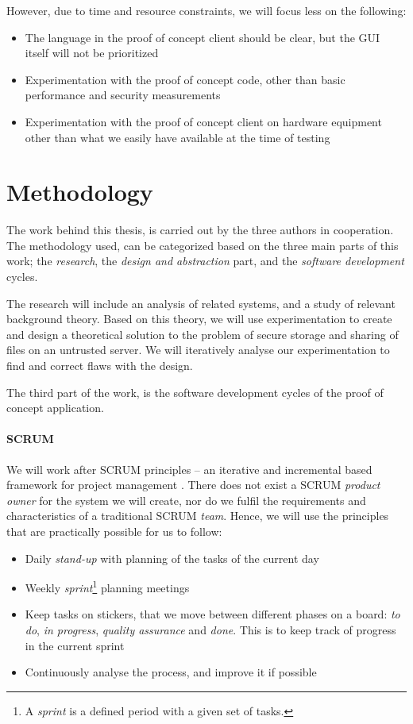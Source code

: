 \documentclass[pdftex,english,10pt,b5paper,twoside]{book}
\begin{document}
However, due to time and resource constraints, we will focus less on the following:
\begin{itemize}
  \item The language in the proof of concept client should be clear, but the
    \ac{GUI} itself will not be prioritized
  \item Experimentation with the proof of concept code, other
    than basic performance and security measurements
  \item Experimentation with the proof of concept client on hardware equipment
    other than what we easily have available at the time of testing
\end{itemize}

\section{Methodology}
\label{methodology}
The work behind this thesis, is carried out by the three authors in
cooperation. The methodology used, can be categorized based on the three main
parts of this work; the \emph{research}, the \emph{design and abstraction}
part, and the \emph{software development} cycles.

The research will include an analysis of related systems, and a study of
relevant background theory. Based on this theory, we will use experimentation
to create and design a theoretical solution to the problem of secure storage
and sharing of files on an untrusted server. We will iteratively analyse our
experimentation to find and correct flaws with the design.

The third part of the work, is the software development cycles of the proof of
concept application.

\paragraph{SCRUM} We will work after SCRUM principles -- an iterative and
incremental based framework for project management \cite{scrum}. There does not
exist a SCRUM \emph{product owner} for the system we will create, nor do we
fulfil the requirements and characteristics of a traditional SCRUM
\emph{team}\cite{scrum}. Hence, we will use the principles that are practically
possible for us to follow:

\begin{itemize}
  \item Daily \emph{stand-up} with planning of the tasks of the current day
  \item Weekly \emph{sprint}\footnote{A \emph{sprint} is a defined period with
    a given set of tasks.} planning meetings
  \item Keep tasks on stickers, that we move between different phases on a
    board: \emph{to do}, \emph{in progress}, \emph{quality assurance} and
    \emph{done}. This is to keep track of progress in the current sprint
  \item Continuously analyse the process, and improve it if possible
\end{itemize}
\end{document}
